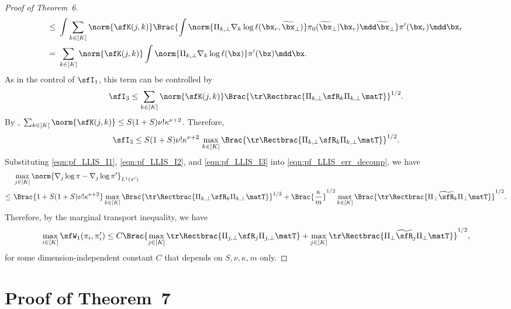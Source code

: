 \documentclass[11pt]{article}
\begin{document}
\begin{proof}[Proof of Theorem~6]
\begin{align*}
    \le~& \int \sum_{k\in[K]} \norm{\sfK(j,k)} \Brac{ \int \norm{ \Pi_{k,\bot} \nabla_k \log \ell(\bx_r,\widetilde{\bx}_\bot) } \pi_0(\widetilde{\bx}_\bot|\bx_r) \mdd \widetilde{\bx}_\bot } \pi'(\bx_r) \mdd \bx_r \\
    =~& \sum_{k\in[K]} \norm{\sfK(j,k)} \int \norm{ \Pi_{k,\bot} \nabla_k \log \ell(\bx) } \pi'(\bx) \mdd \bx. 
\end{align*}
%
As in the control of $\sfI_1$, this term can be controlled by
\[
    \sfI_3 \le \sum_{k\in[K]} \norm{\sfK(j,k)} \Brac{ \tr \Rectbrac{ \Pi_{k,\bot} \sfR_k \Pi_{k,\bot}\matT } }^{1/2}.
\]
By , $\sum_{k\in[K]} \norm{\sfK(j,k)} \le S(1+S) \nu! \kappa^{\nu+2}$. Therefore,
\begin{equation}
\label{eqn:pf_LLIS_I3}
    \sfI_3 \le S(1+S) \nu! \kappa^{\nu+2}\, \max_{k\in[K]} \Brac{ \tr \Rectbrac{ \Pi_{k,\bot} \sfR_k \Pi_{k,\bot}\matT } }^{1/2}.
\end{equation}
Substituting \eqref{eqn:pf_LLIS_I1}, \eqref{eqn:pf_LLIS_I2}, and \eqref{eqn:pf_LLIS_I3} into \eqref{eqn:pf_LLIS_err_decomp}, we have
\begin{align*}
    & \max_{j\in[K]} \norm{ \nabla_j \log \pi - \nabla_j \log \pi' }_{L^1(\pi')} \\
    \le~& \Brac{ 1 + S(1+S) \nu! \kappa^{\nu+2} } \max_{k\in[K]} \Brac{ \tr \Rectbrac{ \Pi_{k,\bot} \sfR_k \Pi_{k,\bot}\matT } }^{1/2} + \Brac{\frac{\kappa}{m}}^{1/2} \max_{k\in[K]} \Brac{ \tr \Rectbrac{ \Pi_\bot \widetilde{\sfR}_k \Pi_\bot\matT } }^{1/2}.
\end{align*}
Therefore, by the marginal transport inequality, we have 
\[
    \max_{i\in[K]} \sfW_1(\pi_i,\pi_i') \le C \Brac{ \max_{j\in[K]} \tr \Rectbrac{ \Pi_{j,\bot} \sfR_j \Pi_{j,\bot}\matT } + \max_{j\in[K]}  \tr \Rectbrac{ \Pi_\bot \widetilde{\sfR}_j \Pi_\bot\matT } }^{1/2},
\]
for some dimension-independent constant $C$ that depends on $S,\nu,\kappa,m$ only.
\end{proof}







\section{Proof of Theorem~7}
\label{app:LSM}
\end{document}
